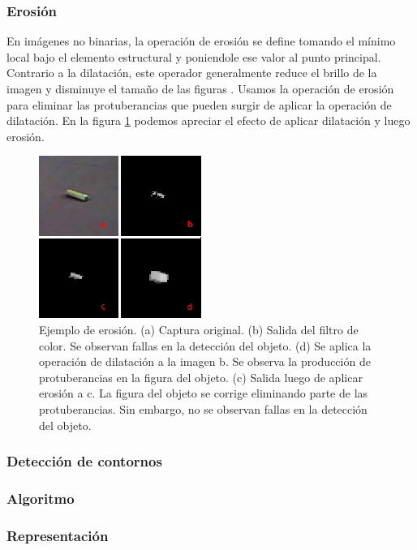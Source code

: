 	\subsubsection*{Erosi\'on}
En imágenes no binarias, la operación de erosión se define tomando el mínimo local bajo el elemento estructural y poniendole ese valor al punto principal. Contrario a la dilatación, este operador generalmente reduce el brillo de la imagen y disminuye el tamaño de las figuras \cite{nasa-dilate-erode}. Usamos la operación de erosión para eliminar las protuberancias que pueden surgir de aplicar la operación de dilatación. En la figura \ref{fig:erode} podemos apreciar el efecto de aplicar dilatación y luego erosión.

\begin{figure}[tpb]
\begin{center}
  \includegraphics[scale=0.8]{figuras/erosion.png}
\end{center}
  \caption{\small Ejemplo de erosión. (a) Captura original. (b) Salida del filtro de color. Se observan fallas en la detección del objeto. (d) Se aplica la operación de dilatación a la imagen b. Se observa la producción de protuberancias en la figura del objeto. (c) Salida luego de aplicar erosión a c. La figura del objeto se corrige eliminando parte de las protuberancias. Sin embargo, no se observan fallas en la detección del objeto. }
  \label{fig:erode}
\end{figure}

	\subsubsection{Detecci\'on de contornos}
		\subsubsection*{Algoritmo}
		\subsubsection*{Representaci\'on}
